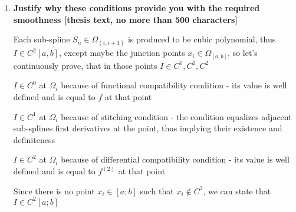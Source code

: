 \documentclass{article}
\begin{document}
\begin{enumerate}
    \item \textbf{Justify why these conditions provide you with the required smoothness [thesis text, no more than 500 characters]}
    
    Each sub-spline \begin{math}S_n\in{\Omega_{(i,i+1)}}\end{math} is produced to be cubic polynomial, thus \begin{math}I\in C^{2}[a,b]\end{math}, except maybe the junction points \begin{math}x_i\in \Omega_{[a,b]}\end{math}, so let's continuously prove, that in those points \begin{math}I\in C^0,C^1,C^2\end{math}
    
    \begin{math}I\in C^0\end{math} at \begin{math}\Omega_i\end{math} because of functional compatibility condition - its value is well defined and is equal to \begin{math}f\end{math} at that point
    
    \begin{math}I\in C^1\end{math} at \begin{math}\Omega_i\end{math} because of stitching condition - the condition equalizes adjacent sub-splines first derivatives at the point, thus implying their existence and definiteness
    
    \begin{math}I\in C^2\end{math} at \begin{math}\Omega_i\end{math} because of differential compatibility condition - its value is well defined and is equal to \begin{math}f^{(2)}\end{math} at that point
    
    Since there is no point \begin{math}x_i\in[a;b]\end{math} such that \begin{math}x_i\notin C^2\end{math}, we can state that \begin{math}I\in C^2[a;b]\end{math}
    

\end{enumerate}
\end{document}
